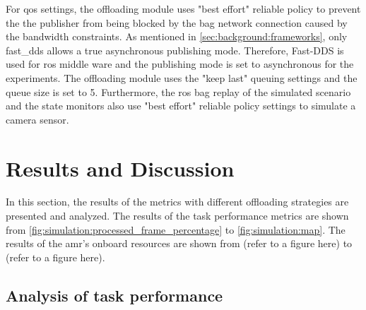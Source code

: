 For \gls{qos} settings, the offloading module uses "best effort" reliable policy to prevent the the publisher from being blocked by the bag network connection caused by the bandwidth constraints. As mentioned in \cref{sec:background:frameworks}, only \gls{fast_dds} allows a true asynchronous publishing mode. Therefore, Fast-DDS is used for \gls{ros} middle ware and the publishing mode is set to asynchronous for the experiments. The offloading module uses the "keep last" queuing settings and the queue size is set to 5. Furthermore, the \gls{ros} bag replay of the simulated scenario and the state monitors also use "best effort" reliable policy settings to simulate a camera sensor. 



\section{Results and Discussion}\label{sec:simulation:results_and_discussion}

In this section, the results of the metrics with different offloading strategies are presented and analyzed. The results of the task performance metrics are shown from \cref{fig:simulation:processed_frame_percentage} to \cref{fig:simulation:map}. The results of the \gls{amr}'s onboard resources are shown from (refer to a figure here) to (refer to a figure here). 

\subsection{Analysis of task performance}


